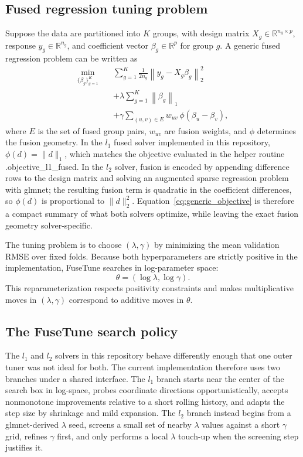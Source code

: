 \documentclass[pdflatex,iicol,sn-mathphys-num]{sn-jnl}
\newcommand{\method}{\textsc{FuseTune}}
\def\textsc#1{#1}%
\def\texttt#1{#1}%
\def\method{FuseTune}%
\def\ell{l}%
\begin{document}
\subsection{Fused regression tuning problem}
Suppose the data are partitioned into \(K\) groups, with design matrix \(X_g \in \mathbb{R}^{n_g \times p}\), response \(y_g \in \mathbb{R}^{n_g}\), and coefficient vector \(\beta_g \in \mathbb{R}^{p}\) for group \(g\). A generic fused regression problem can be written as
\begin{equation}
\begin{aligned}
\min_{\{\beta_g\}_{g=1}^{K}} \quad
& \sum_{g=1}^{K} \frac{1}{2 n_g}\left\| y_g - X_g \beta_g \right\|_2^2 \\
& + \lambda \sum_{g=1}^{K} \left\| \beta_g \right\|_1 \\
& + \gamma \sum_{(u,v)\in E} w_{uv}\,\phi(\beta_u-\beta_v),
\end{aligned}
\label{eq:generic_objective}
\end{equation}
where \(E\) is the set of fused group pairs, \(w_{uv}\) are fusion weights, and \(\phi\) determines the fusion geometry. In the \(\ell_1\) fused solver implemented in this repository, \(\phi(d)=\|d\|_1\), which matches the objective evaluated in the helper routine \texttt{.objective\_l1\_fused}. In the \(\ell_2\) solver, fusion is encoded by appending difference rows to the design matrix and solving an augmented sparse regression problem with \texttt{glmnet}; the resulting fusion term is quadratic in the coefficient differences, so \(\phi(d)\) is proportional to \(\|d\|_2^2\). Equation~\eqref{eq:generic_objective} is therefore a compact summary of what both solvers optimize, while leaving the exact fusion geometry solver-specific.

The tuning problem is to choose \((\lambda,\gamma)\) by minimizing the mean validation RMSE over fixed folds. Because both hyperparameters are strictly positive in the implementation, \method{} searches in log-parameter space:
\begin{equation}
\theta = (\log \lambda,\log \gamma).
\label{eq:log_param}
\end{equation}
This reparameterization respects positivity constraints and makes multiplicative moves in \((\lambda,\gamma)\) correspond to additive moves in \(\theta\).

\subsection{The \method{} search policy}
The \(\ell_1\) and \(\ell_2\) solvers in this repository behave differently enough that one outer tuner was not ideal for both. The current implementation therefore uses two branches under a shared interface. The \(\ell_1\) branch starts near the center of the search box in log-space, probes coordinate directions opportunistically, accepts nonmonotone improvements relative to a short rolling history, and adapts the step size by shrinkage and mild expansion. The \(\ell_2\) branch instead begins from a \texttt{glmnet}-derived \(\lambda\) seed, screens a small set of nearby \(\lambda\) values against a short \(\gamma\) grid, refines \(\gamma\) first, and only performs a local \(\lambda\) touch-up when the screening step justifies it.
\end{document}
